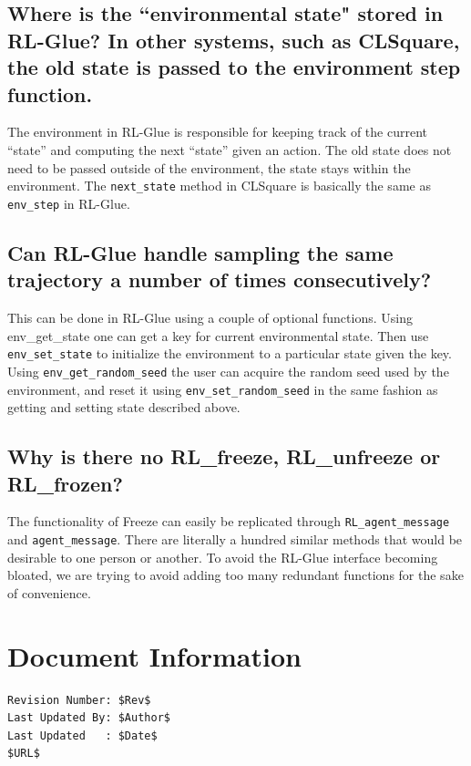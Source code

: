\documentclass[11pt]{article}
\begin{document}
\subsection{Where is the ``environmental state" stored in RL-Glue? In other systems, such as CLSquare, the old state is passed to the environment step function.}
The environment in RL-Glue is responsible for keeping  track of the current ``state'' and computing the next ``state'' given an action. The old state does not need to be passed
outside of the environment, the state stays within the  environment. The \texttt{next\_state} method in CLSquare is basically the same as \texttt{env\_step} in RL-Glue.


\subsection{Can RL-Glue handle sampling the same trajectory a number of times consecutively?}
This can be done in RL-Glue using a couple of optional functions. Using env\_get\_state one can get a key for current environmental state. Then use \texttt{env\_set\_state} to initialize the environment to a particular state  given the key. Using \texttt{env\_get\_random\_seed} the user can acquire the random seed used by the environment, and reset it using \texttt{env\_set\_random\_seed} in the same fashion as getting and setting state described above. 

\subsection{Why is there no RL\_freeze, RL\_unfreeze or RL\_frozen?}
The functionality of Freeze can easily be replicated through \texttt{RL\_agent\_message} and \texttt{agent\_message}.  There are literally a hundred similar methods that would 
be desirable to one person or another. To avoid the RL-Glue interface becoming bloated, we are trying to avoid adding too many redundant functions for the sake of convenience.


\section*{Document Information}
\begin{verbatim}
Revision Number: $Rev$
Last Updated By: $Author$
Last Updated   : $Date$
$URL$
\end{verbatim}
\end{document}
